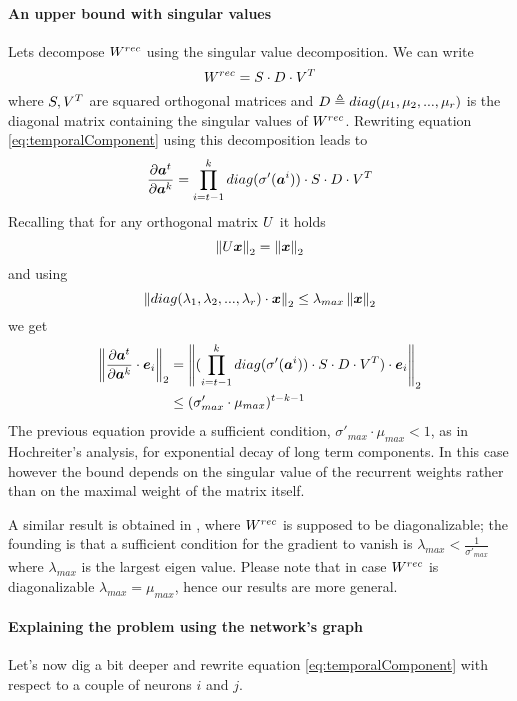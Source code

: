 \paragraph{An upper bound with singular values}
Lets decompose $W^{rec}$ using the singular value decomposition. We can write
\begin{equation}
 W^{rec} =  S\cdot D\cdot V^T
\end{equation}
where $S,V^T$ are squared orthogonal matrices and $D\triangleq diag(\mu_1, \mu_2,...,\mu_r)$ is the diagonal matrix containing the singular values of $W^{rec}$.
Rewriting equation \ref{eq:temporalComponent} using this decomposition leads to
\begin{equation}
\frac{\partial \boldsymbol{a}^t}{\partial \boldsymbol{a}^k} = \prod_{i=t-1}^{k}  diag(\sigma'(\boldsymbol{a}^i)) \cdot S\cdot D \cdot V^T
\end{equation}
Recalling that for any orthogonal matrix $U$ it holds $$\left\Vert U\boldsymbol{x} \right\Vert_2=\left\Vert \boldsymbol{x} \right\Vert_2$$  and using 
$$\left\Vert diag(\lambda_1, \lambda_2,...,\lambda_r)\cdot \boldsymbol{x} \right\Vert_2 \leq \lambda_{max} \left\Vert \boldsymbol{x} \right\Vert_2$$ we get
\begin{align}
\left\Vert \frac{\partial \boldsymbol{a}^t}{\partial \boldsymbol{a}^k} \cdot \boldsymbol{e}_i \right\Vert_2 &= \left\Vert  (\prod_{i=t-1}^{k} diag(\sigma'(\boldsymbol{a}^i)) \cdot S\cdot D \cdot V^T) \cdot \boldsymbol{e}_i \right\Vert_2\\
&\leq (\sigma'_{max} \cdot \mu_{max})^{t-k-1}
\end{align}
The previous equation provide a sufficient condition, $\sigma'_{max} \cdot \mu_{max} <1 $, as in Hochreiter's analysis, for exponential decay of long term components. In this case however the bound depends on the singular value
of the recurrent weights rather than on the maximal weight of the matrix itself. 

A similar result is obtained in \cite{pascanu}, where $W^{rec}$ is supposed to be diagonalizable; the founding is that a sufficient condition for the gradient to vanish is $\lambda_{max} <  \frac{1}{\sigma'_{max}}$ where $\lambda_{max}$ is the largest eigen value. Please note that in case $W^{rec}$ is diagonalizable $\lambda_{max}=\mu_{max}$, hence our results are more general.

\paragraph{Explaining the problem using the network's graph}
Let's now dig a bit deeper and rewrite equation \ref{eq:temporalComponent} with respect to a couple of neurons $i$ and $j$.

